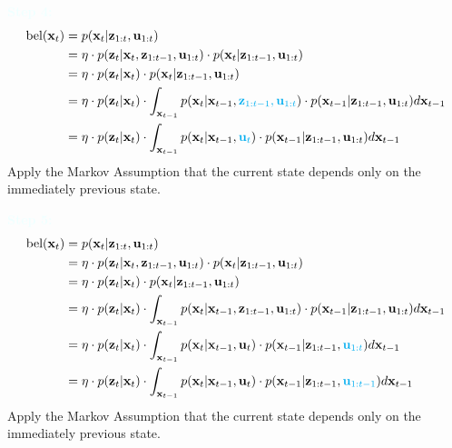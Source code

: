 \documentclass[10pt]{article}
\newcommand{\textbfazure}[1]{\textcolor{azure}{\textbf{#1}}}
\begin{document}
\textbfazure{Step 4:}
\begin{equation}
	\begin{aligned}
		\text{bel}(\mathbf{x}_{t}) & = p( \mathbf{x}_{t}  | \mathbf{z}_{1:t}, \mathbf{u}_{1:t}) \\
		& = \eta \cdot p(\mathbf{z}_{t} |  \mathbf{x}_{t}, \mathbf{z}_{1:t-1}, \mathbf{u}_{1:t}) \cdot p( \mathbf{x}_{t} | \mathbf{z}_{1:t-1}, \mathbf{u}_{1:t}) \\
		& = \eta \cdot p(\mathbf{z}_{t} |  \mathbf{x}_{t}) \cdot p( \mathbf{x}_{t} | \mathbf{z}_{1:t-1}, \mathbf{u}_{1:t}) \\
		& = \eta \cdot p(\mathbf{z}_{t} |  \mathbf{x}_{t}) \cdot \int_{\mathbf{x}_{t-1}} p( \mathbf{x}_{t} | \mathbf{x}_{t-1},{\color{Cyan} \mathbf{z}_{1:t-1}, \mathbf{u}_{1:t} } ) \cdot p(\mathbf{x}_{t-1} | \mathbf{z}_{1:t-1}, \mathbf{u}_{1:t}) d\mathbf{x}_{t-1}\\
		& = \eta \cdot p(\mathbf{z}_{t} |  \mathbf{x}_{t}) \cdot \int_{\mathbf{x}_{t-1}} p( \mathbf{x}_{t} | \mathbf{x}_{t-1}, {\color{Cyan} \mathbf{u}_{t} } ) \cdot p(\mathbf{x}_{t-1} | \mathbf{z}_{1:t-1}, \mathbf{u}_{1:t}) d\mathbf{x}_{t-1} \\
	\end{aligned} 
\end{equation}
Apply the Markov Assumption that the current state depends only on the immediately previous state.

\textbfazure{Step 5:}
\begin{equation}
	\begin{aligned}
		\text{bel}(\mathbf{x}_{t}) & = p( \mathbf{x}_{t}  | \mathbf{z}_{1:t}, \mathbf{u}_{1:t}) \\
		& = \eta \cdot p(\mathbf{z}_{t} |  \mathbf{x}_{t}, \mathbf{z}_{1:t-1}, \mathbf{u}_{1:t}) \cdot p( \mathbf{x}_{t} | \mathbf{z}_{1:t-1}, \mathbf{u}_{1:t}) \\
		& = \eta \cdot p(\mathbf{z}_{t} |  \mathbf{x}_{t}) \cdot p( \mathbf{x}_{t} | \mathbf{z}_{1:t-1}, \mathbf{u}_{1:t}) \\
		& = \eta \cdot p(\mathbf{z}_{t} |  \mathbf{x}_{t}) \cdot \int_{\mathbf{x}_{t-1}} p( \mathbf{x}_{t} | \mathbf{x}_{t-1},\mathbf{z}_{1:t-1}, \mathbf{u}_{1:t}) \cdot p(\mathbf{x}_{t-1} | \mathbf{z}_{1:t-1}, \mathbf{u}_{1:t}) d\mathbf{x}_{t-1}\\
		& = \eta \cdot p(\mathbf{z}_{t} |  \mathbf{x}_{t}) \cdot \int_{\mathbf{x}_{t-1}} p( \mathbf{x}_{t} | \mathbf{x}_{t-1},\mathbf{u}_{t}) \cdot p(\mathbf{x}_{t-1} | \mathbf{z}_{1:t-1}, {\color{Cyan}  \mathbf{u}_{1:t} } ) d\mathbf{x}_{t-1} \\
		& = \eta \cdot p(\mathbf{z}_{t} |  \mathbf{x}_{t}) \cdot \int_{\mathbf{x}_{t-1}} p( \mathbf{x}_{t} | \mathbf{x}_{t-1},\mathbf{u}_{t}) \cdot p(\mathbf{x}_{t-1} | \mathbf{z}_{1:t-1}, {\color{Cyan} \mathbf{u}_{1:t-1} } ) d\mathbf{x}_{t-1} \\
	\end{aligned} 
\end{equation}
Apply the Markov Assumption that the current state depends only on the immediately previous state.
\end{document}
